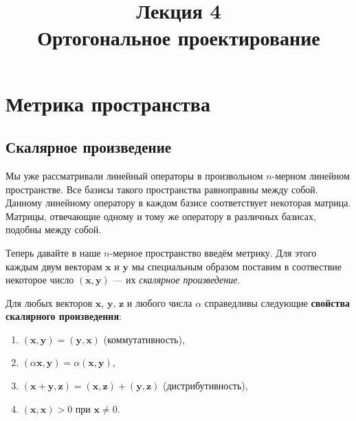 \documentclass[11pt,a4paper]{article}
\title{Лекция 4 \\
    Ортогональное проектирование
    }
\providecommand{\tightlist}{%
      \setlength{\itemsep}{0pt}\setlength{\parskip}{0pt}}
\begin{document}
    
    \maketitle
    
    
    \hypertarget{ux43cux435ux442ux440ux438ux43aux430-ux43fux440ux43eux441ux442ux440ux430ux43dux441ux442ux432ux430}{%
\section{Метрика
пространства}\label{ux43cux435ux442ux440ux438ux43aux430-ux43fux440ux43eux441ux442ux440ux430ux43dux441ux442ux432ux430}}

\hypertarget{ux441ux43aux430ux43bux44fux440ux43dux43eux435-ux43fux440ux43eux438ux437ux432ux435ux434ux435ux43dux438ux435}{%
\subsection{Скалярное
произведение}\label{ux441ux43aux430ux43bux44fux440ux43dux43eux435-ux43fux440ux43eux438ux437ux432ux435ux434ux435ux43dux438ux435}}

Мы уже рассматривали линейный операторы в произвольном \(n\)-мерном
линейном пространстве. Все базисы такого пространства равноправны между
собой. Данному линейному оператору в каждом базисе соответствует
некоторая матрица. Матрицы, отвечающие одному и тому же оператору в
различных базисах, подобны между собой.

Теперь давайте в наше \(n\)-мерное пространство введём метрику. Для
этого каждым двум векторам \(\mathbf{x}\) и \(\mathbf{y}\) мы
специальным образом поставим в соотвествие некоторое число
\((\mathbf{x}, \mathbf{y})\) --- их \emph{скалярное произведение}.

Для любых векторов \(\mathbf{x}\), \(\mathbf{y}\), \(\mathbf{z}\) и
любого числа \(\alpha\) справедливы следующие \textbf{свойства
скалярного произведения}:

\begin{enumerate}
\def\labelenumi{\arabic{enumi}.}
\tightlist
\item
  \((\mathbf{x}, \mathbf{y}) = (\mathbf{y}, \mathbf{x})\)
  (коммутативность),
\item
  \((\alpha \mathbf{x}, \mathbf{y}) = \alpha (\mathbf{x}, \mathbf{y})\),
\item
  \((\mathbf{x} + \mathbf{y}, \mathbf{z}) = (\mathbf{x}, \mathbf{z}) + (\mathbf{y}, \mathbf{z})\)
  (дистрибутивность),
\item
  \((\mathbf{x}, \mathbf{x}) > 0\) при \(\mathbf{x} \ne 0\).
\end{enumerate}
\end{document}
